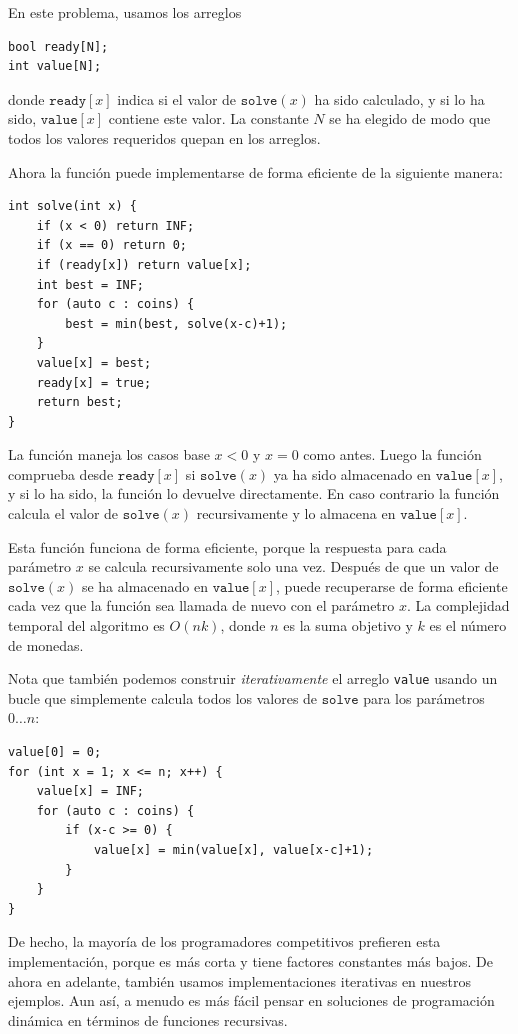 En este problema, usamos los arreglos
\begin{lstlisting}
bool ready[N];
int value[N];
\end{lstlisting}

donde $\texttt{ready}[x]$ indica
si el valor de $\texttt{solve}(x)$ ha sido calculado,
y si lo ha sido, $\texttt{value}[x]$
contiene este valor.
La constante $N$ se ha elegido de modo
que todos los valores requeridos quepan en los arreglos.

Ahora la función puede implementarse
de forma eficiente de la siguiente manera:

\begin{lstlisting}
int solve(int x) {
    if (x < 0) return INF;
    if (x == 0) return 0;
    if (ready[x]) return value[x];
    int best = INF;
    for (auto c : coins) {
        best = min(best, solve(x-c)+1);
    }
    value[x] = best;
    ready[x] = true;
    return best;
}
\end{lstlisting}

La función maneja los casos base
$x<0$ y $x=0$ como antes.
Luego la función comprueba desde
$\texttt{ready}[x]$ si
$\texttt{solve}(x)$ ya ha sido almacenado
en $\texttt{value}[x]$,
y si lo ha sido, la función lo devuelve directamente.
En caso contrario la función calcula el valor
de $\texttt{solve}(x)$
recursivamente y lo almacena en $\texttt{value}[x]$.

Esta función funciona de forma eficiente,
porque la respuesta para cada parámetro $x$
se calcula recursivamente solo una vez.
Después de que un valor de $\texttt{solve}(x)$ se ha almacenado en $\texttt{value}[x]$,
puede recuperarse de forma eficiente cada vez que la
función sea llamada de nuevo con el parámetro $x$.
La complejidad temporal del algoritmo es $O(nk)$,
donde $n$ es la suma objetivo y $k$ es el número de monedas.

Nota que también podemos construir \emph{iterativamente}
el arreglo \texttt{value} usando
un bucle que simplemente calcula todos los valores
de $\texttt{solve}$ para los parámetros $0 \ldots n$:
\begin{lstlisting}
value[0] = 0;
for (int x = 1; x <= n; x++) {
    value[x] = INF;
    for (auto c : coins) {
        if (x-c >= 0) {
            value[x] = min(value[x], value[x-c]+1);
        }
    }
}
\end{lstlisting}

De hecho, la mayoría de los programadores competitivos prefieren esta
implementación, porque es más corta y tiene
factores constantes más bajos.
De ahora en adelante, también usamos implementaciones iterativas
en nuestros ejemplos.
Aun así, a menudo es más fácil pensar en
soluciones de programación dinámica
en términos de funciones recursivas.


